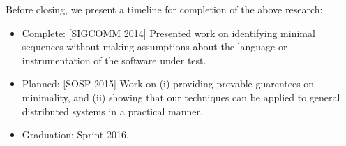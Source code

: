 Before closing, we present a timeline for completion of the above research:

\begin{itemize}
\item Complete: [SIGCOMM 2014] Presented work on identifying minimal sequences without making assumptions about the
language or instrumentation of the software under test.
\item Planned: [SOSP 2015] Work on (i) providing provable guarentees on minimality, and (ii) showing
that our techniques can be applied to general distributed systems in a
practical manner.
\item Graduation: Sprint 2016.
\end{itemize}
